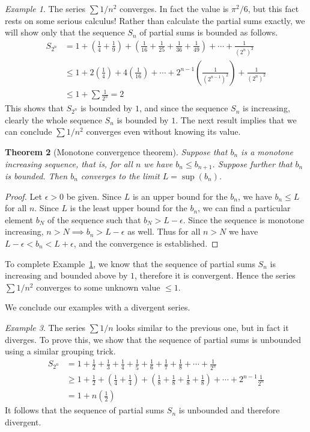 \documentclass[11pt,oneside]{amsbook}
\theoremstyle{definition}
\theoremstyle{plain}
\newtheorem{thm}{Theorem}[section]
\theoremstyle{definition}
\theoremstyle{remark}
\newtheorem{example}[thm]{Example}
\numberwithin{equation}{section}
\numberwithin{figure}{section}
\begin{document}
\begin{example}
  \label{ex:1/n^2}
  The series $\sum1/n^2$ converges. In fact the value is $\pi^2/6$, but this fact rests on some serious calculus! Rather than calculate the partial sums exactly, we will show only that the sequence $S_n$ of partial sums is bounded as follows. 
  \begin{align*}
    S_{2^n}&=1+\left(\frac14+\frac19\right)
             +\left(\frac1{16}+\frac1{25}+\frac1{36}+\frac1{49}\right)
             +\cdots
             +\frac1{(2^n)^2}\\
           &\leq1+2\left(\frac14\right)+4\left(\frac1{16}\right)
             +\cdots+2^{n-1}\left(\frac1{(2^{n-1})^2}\right)+\frac1{(2^n)^2}\\
           &\leq1+\sum\frac1{2^n}=2
  \end{align*}
  This shows that $S_{2^n}$ is bounded by $1$, and since the sequence $S_n$ is increasing, clearly the whole sequence $S_n$ is bounded by $1$. The next result implies that we can conclude $\sum1/n^2$ converges even without knowing its value.
\end{example}

\begin{thm}[Monotone convergence theorem]
  Suppose that $b_n$ is a monotone increasing sequence, that is, for all $n$ we have $b_n\leq b_{n+1}$. Suppose further that $b_n$ is bounded. Then $b_n$ converges to the limit $L=\sup(b_n)$.
\end{thm}

\begin{proof}
  Let $\epsilon>0$ be given. Since $L$ is an upper bound for the $b_n$, we have $b_n\leq L$ for all $n$. Since $L$ is the least upper bound for the $b_n$, we can find a particular element $b_N$ of the sequence such that $b_N>L-\epsilon$. Since the sequence is monotone increasing, $n>N\implies b_n>L-\epsilon$ as well. Thus for all $n>N$ we have $L-\epsilon<b_n<L+\epsilon$, and the convergence is established.
\end{proof}

To complete Example~\ref{ex:1/n^2}, we know that the sequence of partial sums $S_n$ is increasing and bounded above by $1$, therefore it is convergent. Hence the series $\sum1/n^2$ converges to some unknown value $\leq1$.

We conclude our examples with a divergent series.

\begin{example}
  The series $\sum 1/n$ looks similar to the previous one, but in fact it diverges. To prove this, we show that the sequence of partial sums is unbounded using a similar grouping trick.
\begin{align*}
  S_{2^n} &= 1+\frac12+\frac13+\frac14+\frac15+\frac16+\frac17+\frac18+
            \cdots+\frac1{2^n}\\
          &\geq 1+\frac12+\left(\frac14+\frac14\right)
            +\left(\frac18+\frac18+\frac18+\frac18\right)
            +\cdots+2^{n-1}\frac1{2^n}\\
          &=1+n\left(\frac12\right)
\end{align*}
It follows that the sequence of partial sums $S_n$ is unbounded and therefore divergent.
\end{example}
\end{document}
